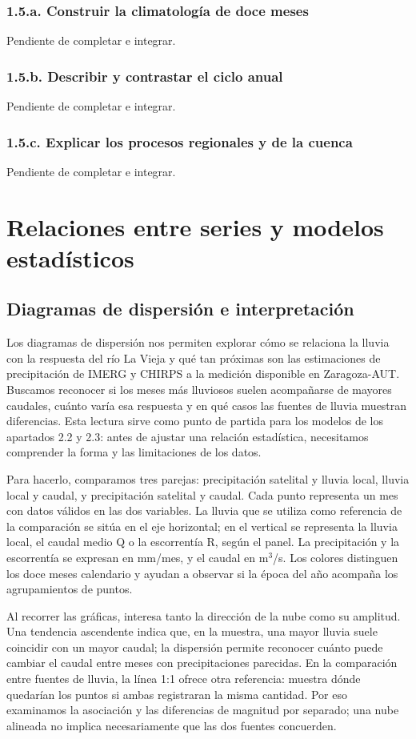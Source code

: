 \documentclass[10pt,a4paper]{article}
\begin{document}
\subsubsection*{1.5.a. Construir la climatología de doce meses}
Pendiente de completar e integrar.
\subsubsection*{1.5.b. Describir y contrastar el ciclo anual}
Pendiente de completar e integrar.
\subsubsection*{1.5.c. Explicar los procesos regionales y de la cuenca}
Pendiente de completar e integrar.
\clearpage
\section{Relaciones entre series y modelos estadísticos}

\subsection{Diagramas de dispersión e interpretación}
Los diagramas de dispersión nos permiten explorar cómo se relaciona la lluvia con la respuesta del río La Vieja y qué tan próximas son las estimaciones de precipitación de IMERG y CHIRPS a la medición disponible en Zaragoza-AUT. Buscamos reconocer si los meses más lluviosos suelen acompañarse de mayores caudales, cuánto varía esa respuesta y en qué casos las fuentes de lluvia muestran diferencias. Esta lectura sirve como punto de partida para los modelos de los apartados 2.2 y 2.3: antes de ajustar una relación estadística, necesitamos comprender la forma y las limitaciones de los datos.

Para hacerlo, comparamos tres parejas: precipitación satelital y lluvia local, lluvia local y caudal, y precipitación satelital y caudal. Cada punto representa un mes con datos válidos en las dos variables. La lluvia que se utiliza como referencia de la comparación se sitúa en el eje horizontal; en el vertical se representa la lluvia local, el caudal medio Q o la escorrentía R, según el panel. La precipitación y la escorrentía se expresan en mm/mes, y el caudal en m$^3$/s. Los colores distinguen los doce meses calendario y ayudan a observar si la época del año acompaña los agrupamientos de puntos.

Al recorrer las gráficas, interesa tanto la dirección de la nube como su amplitud. Una tendencia ascendente indica que, en la muestra, una mayor lluvia suele coincidir con un mayor caudal; la dispersión permite reconocer cuánto puede cambiar el caudal entre meses con precipitaciones parecidas. En la comparación entre fuentes de lluvia, la línea 1:1 ofrece otra referencia: muestra dónde quedarían los puntos si ambas registraran la misma cantidad. Por eso examinamos la asociación y las diferencias de magnitud por separado; una nube alineada no implica necesariamente que las dos fuentes concuerden.
\end{document}
